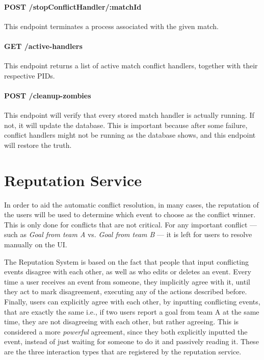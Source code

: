 \paragraph{POST /stopConflictHandler/:matchId}
This endpoint terminates a process associated with the given match.

\paragraph{GET /active-handlers}
This endpoint returns a list of active match conflict handlers, together with their respective PIDs.

\paragraph{POST /cleanup-zombies}
This endpoint will verify that every stored match handler is actually running. If not, it will update the database. This is important because after some failure, conflict handlers might not be running as the database shows, and this endpoint will restore the truth.

\section{Reputation Service}

In order to aid the automatic conflict resolution, in many cases, the reputation of the users will be used to determine which event to choose as the conflict winner. This is only done for conflicts that are not critical. For any important conflict --- such as \textit{Goal from team A} vs. \textit{Goal from team B} --- it is left for users to resolve manually on the UI.

The Reputation System is based on the fact that people that input conflicting events disagree with each other, as well as who edits or deletes an event. Every time a user receives an event from someone, they implicitly agree with it, until they act to mark disagreement, executing any of the actions described before. Finally, users can explicitly agree with each other, by inputting conflicting events, that are exactly the same i.e., if two users report a goal from team A at the same time, they are not disagreeing with each other, but rather agreeing. This is considered a more \textit{powerful} agreement, since they both explicitly inputted the event, instead of just waiting for someone to do it and passively reading it. These are the three interaction types that are registered by the reputation service.

